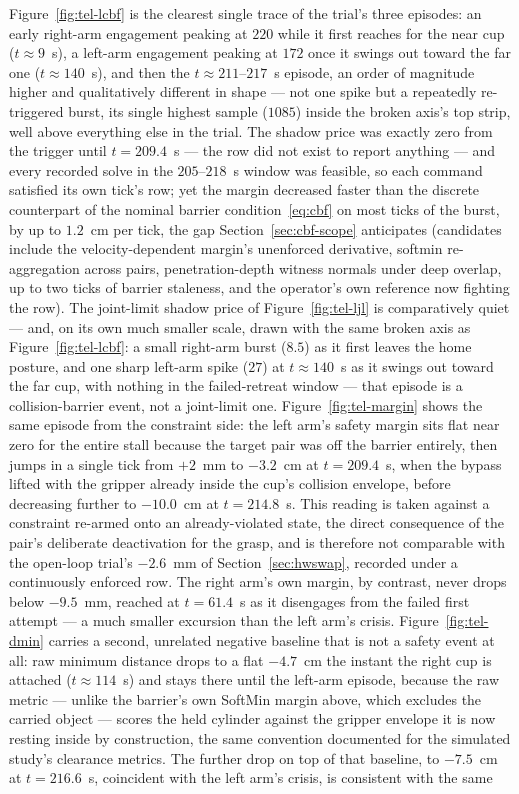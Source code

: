 \documentclass[12pt,a4paper,twoside,openright]{report}
\begin{document}
Figure~\ref{fig:tel-lcbf} is the clearest single trace of the trial's three episodes: an early right-arm engagement peaking at $220$ while it first reaches for the near cup ($t\approx9$~s), a left-arm engagement peaking at $172$ once it swings out toward the far one ($t\approx140$~s), and then the $t\approx211$--$217$~s episode, an order of magnitude higher and qualitatively different in shape --- not one spike but a repeatedly re-triggered burst, its single highest sample ($1085$) inside the broken axis's top strip, well above everything else in the trial. The shadow price was exactly zero from the trigger until $t=209.4$~s --- the row did not exist to report anything --- and every recorded solve in the $205$--$218$~s window was feasible, so each command satisfied its own tick's row; yet the margin decreased faster than the discrete counterpart of the nominal barrier condition~\eqref{eq:cbf} on most ticks of the burst, by up to $1.2$~cm per tick, the gap Section~\ref{sec:cbf-scope} anticipates (candidates include the velocity-dependent margin's unenforced derivative, softmin re-aggregation across pairs, penetration-depth witness normals under deep overlap, up to two ticks of barrier staleness, and the operator's own reference now fighting the row). The joint-limit shadow price of Figure~\ref{fig:tel-ljl} is comparatively quiet --- and, on its own much smaller scale, drawn with the same broken axis as Figure~\ref{fig:tel-lcbf}: a small right-arm burst ($8.5$) as it first leaves the home posture, and one sharp left-arm spike ($27$) at $t\approx140$~s as it swings out toward the far cup, with nothing in the failed-retreat window --- that episode is a collision-barrier event, not a joint-limit one. Figure~\ref{fig:tel-margin} shows the same episode from the constraint side: the left arm's safety margin sits flat near zero for the entire stall because the target pair was off the barrier entirely, then jumps in a single tick from $+2$~mm to $-3.2$~cm at $t=209.4$~s, when the bypass lifted with the gripper already inside the cup's collision envelope, before decreasing further to $-10.0$~cm at $t=214.8$~s. This reading is taken against a constraint re-armed onto an already-violated state, the direct consequence of the pair's deliberate deactivation for the grasp, and is therefore not comparable with the open-loop trial's $-2.6$~mm of Section~\ref{sec:hwswap}, recorded under a continuously enforced row. The right arm's own margin, by contrast, never drops below $-9.5$~mm, reached at $t=61.4$~s as it disengages from the failed first attempt --- a much smaller excursion than the left arm's crisis. Figure~\ref{fig:tel-dmin} carries a second, unrelated negative baseline that is not a safety event at all: raw minimum distance drops to a flat $-4.7$~cm the instant the right cup is attached ($t\approx114$~s) and stays there until the left-arm episode, because the raw metric --- unlike the barrier's own SoftMin margin above, which excludes the carried object --- scores the held cylinder against the gripper envelope it is now resting inside by construction, the same convention documented for the simulated study's clearance metrics. The further drop on top of that baseline, to $-7.5$~cm at $t=216.6$~s, coincident with the left arm's crisis, is consistent with the same 
\end{document}
